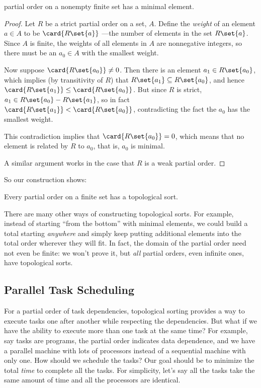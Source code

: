 \begin{lemma}\label{finmin}
   partial order on a nonempty finite set has
  a minimal element.

\begin{proof} Let $R$ be a strict partial order on a set, $A$.  Define the \emph{weight}
of an element $a \in A$ to be $\card{R\set{a}}$ ---the number of elements
in the set $R\set{a}$.  Since $A$ is finite, the weights of all elements
in $A$ are nonnegative integers, so there must be an $a_0 \in A$ with the
smallest weight.

Now suppose $\card{R\set{a_0}} \neq 0$.  Then there is an element $a_1 \in
R\set{a_0}$, which implies (by transitivity of $R$) that $R\set{a_1}
\subseteq R\set{a_0}$, and hence $\card{R\set{a_1}} \leq
\card{R\set{a_0}}$.  But since $R$ is strict, $a_1 \in R\set{a_0} -
R\set{a_1}$, so in fact $\card{R\set{a_1}} < \card{R\set{a_0}}$,
contradicting the fact the $a_0$ has the smallest weight.

This contradiction implies that $\card{R\set{a_0}} = 0$, which means that
no element is related by $R$ to $a_0$, that is, $a_0$ is minimal.

A similar argument works in the case that $R$ is a weak partial order.

\end{proof}
\end{lemma}
\fi

So our construction shows:

\begin{theorem}\label{thm:topological}
Every partial order on a finite set has a topological sort.
\end{theorem}

There are many other ways of constructing topological sorts.  For example,
instead of starting ``from the bottom'' with minimal elements, we could
build a total starting \emph{anywhere} and simply keep putting additional
elements into the total order wherever they will fit.  In fact, the domain
of the partial order need not even be finite: we won't prove it, but \emph{all}
partial orders, even infinite ones, have topological sorts.

\subsection{Parallel Task Scheduling}

For a partial order of task dependencies, topological sorting provides a
way to execute tasks one after another while respecting the dependencies.
But what if we have the ability to execute more than one task at the same
time?  For example, say tasks are programs, the partial order indicates
data dependence, and we have a parallel machine with lots of processors
instead of a sequential machine with only one.  How should we schedule the
tasks?  Our goal should be to minimize the total \emph{time} to complete
all the tasks.  For simplicity, let's say all the tasks take the same
amount of time and all the processors are identical.

